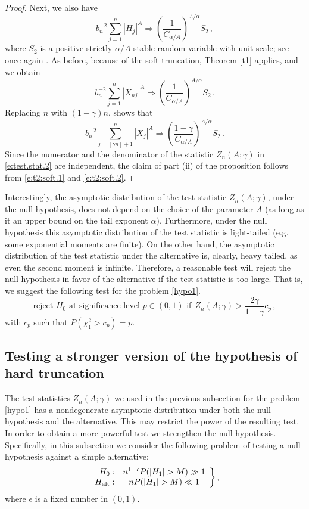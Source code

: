 \documentclass[11pt]{amsart}
\numberwithin{equation}{section}
\begin{document}
\begin{proof}
Next, we also have
$$
b_n^{-2}\sum_{j=1}^n|H_{j}|^A \Rightarrow
\left(\frac{1}{C_{\alpha/A}}\right)^{A/\alpha}S_2\,,
$$
where $S_2$ is a positive strictly
$\alpha/A$-stable random variable with unit scale; see once again
\cite{feller:1971}. As before, because of the soft truncation, Theorem
\ref{t1} applies, and we obtain
$$
b_n^{-2}\sum_{j=1}^n|X_{nj}|^A \Rightarrow
\left(\frac{1}{C_{\alpha/A}}\right)^{A/\alpha}S_2\,.
$$
Replacing $n$ with $(1-\gamma)n$, shows that
\begin{equation} \label{e:t2:soft.2}
b_n^{-2}\sum_{j=[\gamma n]+1}^n|X_{j}|^A \Rightarrow
\left(\frac{1-\gamma}{C_{\alpha/A}}\right)^{A/\alpha}S_2\,.
\end{equation}
Since the numerator and the denominator of the statistic
$Z_n(A;\gamma)$ in \eqref{e:test.stat.2} are independent, the claim of
part (ii) of the proposition follows from \eqref{e:t2:soft.1} and
\eqref{e:t2:soft.2}.
\end{proof}

Interestingly, the asymptotic distribution of the test statistic
$Z_n(A;\gamma)$, under the null hypothesis, does not depend on the
choice of the parameter $A$ (as long as it an  upper bound on the tail
exponent
$\alpha$). Furthermore, under the null hypothesis this asymptotic
distribution of the test statistic is
light-tailed (e.g. some  exponential moments are finite).  On the
other hand, the asymptotic distribution of the test statistic
under the alternative is, clearly, heavy tailed, as even the second
moment is infinite. Therefore, a reasonable test will reject the null
hypothesis in favor of the alternative if the test statistic is too
large. That is, we suggest the following test
for the problem \eqref{hypo1}.
\begin{equation} \label{e:test.h1.formal}
\text{reject $H_0$ at significance level $p\in (0,1)$ if} \ \
Z_n(A;\gamma) >\frac{2\gamma}{1-\gamma}c_p\,,
\end{equation}
with $c_p$ such that $P(\chi_1^2>c_p)=p$.

\subsection{Testing a stronger version of the hypothesis of hard
truncation}\label{test3}

The test statistics $Z_n(A;\gamma)$ we used in the previous subsection
for the problem \eqref{hypo1} has a nondegenerate asymptotic
distribution under both the null hypothesis and the alternative. This
may restrict the power of the resulting test. In order to obtain a
more powerful test we strengthen the null hypothesis. Specifically,
in this subsection we consider the following problem of testing a null
hypothesis against a simple alternative:
\begin{equation} \label{hypo3}
\left. \begin{array}{rc}
H_0:&n^{1-\epsilon}P(|H_1|>M)\gg1\\
H_{\rm alt}:&nP(|H_1|>M)\ll1
\end{array} \right\},
\end{equation}
where $\epsilon$ is a fixed number in $(0,1)$.
\end{document}
